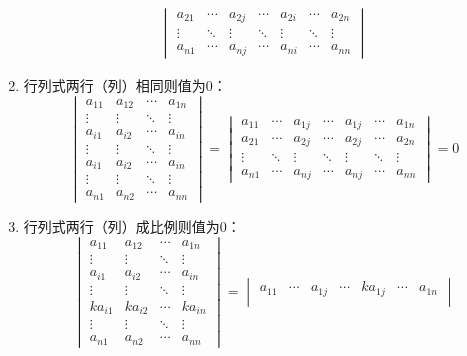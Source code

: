 \begin{property}
\begin{enumerate}
\begin{gather*}
\begin{vmatrix}
				a_{21} & \cdots & a_{2j} & \cdots & a_{2i} & \cdots & a_{2n} \\
				\vdots & \ddots & \vdots & \ddots & \vdots & \ddots & \vdots \\
				a_{n1} & \cdots & a_{nj} & \cdots & a_{ni} & \cdots & a_{nn}
			\end{vmatrix}
		\end{gather*}
		\item 行列式两行（列）相同则值为$0$：
		\begin{equation*}
			\begin{vmatrix}
				a_{11} & a_{12} & \cdots & a_{1n} \\
				\vdots & \vdots & \ddots & \vdots \\
				a_{i1} & a_{i2} & \cdots & a_{in} \\
				\vdots & \vdots & \ddots & \vdots \\
				a_{i1} & a_{i2} & \cdots & a_{in} \\
				\vdots & \vdots & \ddots & \vdots \\
				a_{n1} & a_{n2} & \cdots & a_{nn}
			\end{vmatrix}=
			\begin{vmatrix}
			a_{11} & \cdots & a_{1j} & \cdots & a_{1j} & \cdots & a_{1n} \\
			a_{21} & \cdots & a_{2j} & \cdots & a_{2j} & \cdots & a_{2n} \\
			\vdots & \ddots & \vdots & \ddots & \vdots & \ddots & \vdots \\
			a_{n1} & \cdots & a_{nj} & \cdots & a_{nj} & \cdots & a_{nn}
			\end{vmatrix}=0
		\end{equation*}
		\item 行列式两行（列）成比例则值为$0$：
		\begin{equation*}
			\begin{vmatrix}
			a_{11} & a_{12} & \cdots & a_{1n} \\
			\vdots & \vdots & \ddots & \vdots \\
			a_{i1} & a_{i2} & \cdots & a_{in} \\
			\vdots & \vdots & \ddots & \vdots \\
			ka_{i1} & ka_{i2} & \cdots & ka_{in} \\
			\vdots & \vdots & \ddots & \vdots \\
			a_{n1} & a_{n2} & \cdots & a_{nn}
			\end{vmatrix}=
			\begin{vmatrix}
			a_{11} & \cdots & a_{1j} & \cdots & ka_{1j} & \cdots & a_{1n} \\

\end{vmatrix}
\end{equation*}
\end{enumerate}
\end{property}
